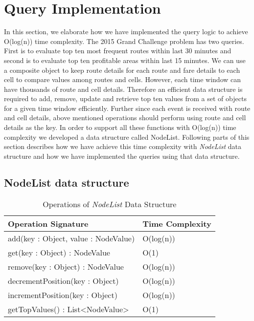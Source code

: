 \section{Query Implementation}
In this section, we elaborate how we have implemented the query logic to achieve O(log(n)) time complexity. The 2015 Grand Challenge problem has two queries. First is to evaluate top ten most frequent routes within last 30 minutes and second is to evaluate top ten profitable areas within last 15 minutes. We can use a composite object to keep route details for each route and fare details to each cell to compare values among routes and cells. However, each time window can have thousands of route and cell details. Therefore an efficient data structure is required to add, remove, update and retrieve top ten values from a set of objects for a given time window efficiently. Further since each event is received with route and cell details, above mentioned operations should perform using route and cell details as the key. In order to support all these functions with O(log(n)) time complexity we developed a data structure called NodeList. Following parts of this section describes how we have achieve this time complexity with \textit{NodeList} data structure and how we have implemented the queries using that data structure.

\subsection{NodeList data structure}

\begin{table}
\centering
\caption{Operations of \textit{NodeList} Data Structure}
\begin{tabular}{|l|l|} \hline
Operation Signature & Time Complexity \\ \hline \hline
add(key : Object, value : NodeValue) & O(log(n)) \\ \hline 
get(key : Object) : NodeValue & O(1) \\ \hline
remove(key : Object) : NodeValue & O(log(n)) \\ \hline
decrementPosition(key : Object) & O(log(n)) \\ \hline
incrementPosition(key : Object) & O(log(n)) \\ \hline
getTopValues() : List<NodeValue> & O(1) \\ \hline
\end{tabular}
\label{nodelist_api}
\end{table}

